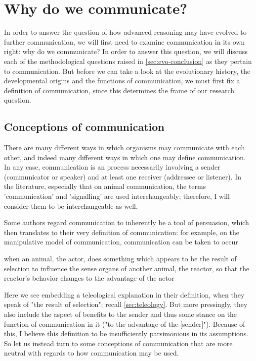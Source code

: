 \chapter{Why do we communicate?}
\label{ch:communication}

In order to answer the question of how advanced reasoning may have evolved to further communication, we will first need to examine communication in its own right: why do we communicate?
In order to answer this question, we will discuss each of the methodological questions raised in \cref{sec:evo-conclusion} as they pertain to communication. But before we can take a look at the evolutionary history, the developmental origins and the functions of communication, we must first fix a definition of communication, since this determines the frame of our research question.

\section{Conceptions of communication}
\label{sec:comm:definition}

There are many different ways in which organisms may communicate with each other, and indeed many different ways in which one may define communication. In any case, communication is an process necessarily involving a sender (communicator or speaker) and at least one receiver (addressee or listener). In the literature, especially that on animal communication, the terms 'communication' and 'signalling' are used interchangeably; therefore, I will consider them to be interchangeable as well.

Some authors regard communication to inherently be a tool of persuasion, which then translates to their very definition of communication: for example, on the manipulative model of communication, communication can be taken to occur
\begin{quoting}
    when an animal, the actor, does something which appears to be the result of selection to influence the sense organs of another animal, the reactor, so that the reactor's behavior changes to the advantage of the actor
    \hfill \citep[p.~283]{DawkinsKrebs78}
\end{quoting}
Here we see \citeauthor{DawkinsKrebs78} embedding a teleological explanation in their definition, when they speak of "the result of selection"; recall \cref{sec:teleology}.
But more pressingly, they also include the aspect of benefits to the sender and thus some stance on the function of communication in it ("to the advantage of the [sender]").
Because of this, I believe this definition to be insufficiently parsimonious in its assumptions. So let us instead turn to some conceptions of communication that are more neutral with regards to how communication may be used.

